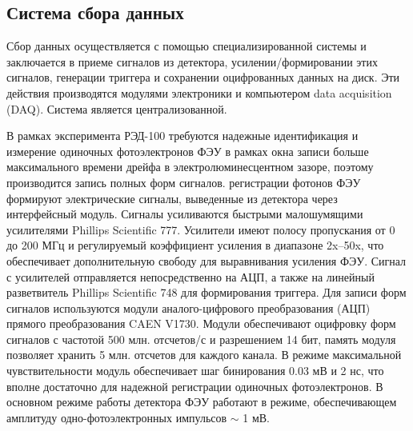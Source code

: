 \subsection{Система сбора данных}
\label{subsect2_1_3}
Сбор данных осуществляется с помощью специализированной системы и заключается в приеме сигналов из детектора, усилении/формировании этих сигналов, генерации триггера и сохранении оцифрованных данных на диск. Эти действия производятся модулями электроники и компьютером data acquisition (DAQ). Система является централизованной. 
\par В рамках эксперимента РЭД-100 требуются надежные идентификация и измерение одиночных фотоэлектронов ФЭУ в рамках окна записи больше максимального времени дрейфа в электролюминесцентном зазоре, поэтому производится запись полных форм сигналов. 
 регистрации фотонов ФЭУ формируют электрические сигналы, выведенные из детектора через интерфейсный модуль. Сигналы усиливаются быстрыми малошумящими усилителями Phillips Scientific 777. Усилители имеют полосу пропускания от 0 до 200 МГц и регулируемый коэффициент усиления в диапазоне 2x–50x, что обеспечивает дополнительную свободу для выравнивания усиления ФЭУ. Сигнал с усилителей отправляется непосредственно на АЦП, а также на линейный разветвитель Phillips Scientific 748 для формирования триггера. Для записи форм сигналов используются модули аналого-цифрового преобразования (АЦП) прямого преобразования CAEN V1730. Модули обеспечивают оцифровку форм сигналов с частотой 500 млн. отсчетов/с и разрешением 14 бит, память модуля позволяет хранить 5 млн. отсчетов для каждого канала. В режиме максимальной чувствительности модуль обеспечивает шаг бинирования 0.03 мВ и 2 нс, что вполне достаточно для надежной регистрации одиночных фотоэлектронов. В основном режиме работы детектора ФЭУ работают в режиме, обеспечивающем амплитуду одно-фотоэлектронных импульсов $\sim$ 1 мВ.


